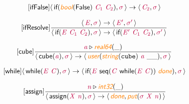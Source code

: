 \documentclass[10pt,leqno,fleqn]{article}
\newcommand{\artVariable}[1]{\mbox{\color{purple}\em #1\/}}
\newcommand{\artConstructor}[1]{\mbox{\sf #1}}
\newcommand{\artCaseInsensitiveLiteral}[1]{\mbox{\tt #1}}
\newcommand{\artSpecial}[1]{\mbox{\color{orange}\sf\em #1}}
\begin{document}
\begin{equation}
\tag*{[\artConstructor{\sf ifFalse}]}
\begin{split}\langle\, \artConstructor{\sf if}(\artSpecial{bool}(\artConstructor{\sf False})\ \artVariable{C$_{1}$}\ \artVariable{C$_{2}$}), \artVariable{$\sigma$}\,\rangle \rightarrow \langle\, \artVariable{C$_{2}$}, \artVariable{$\sigma$}\,\rangle 
\end{split}
\end{equation}

\begin{equation}
\tag*{[\artConstructor{\sf ifResolve}]}
\begin{split}\frac{\langle\, \artVariable{E}, \artVariable{$\sigma$}\,\rangle \rightarrow \langle\, \artVariable{E\/$^\prime$}, \artVariable{$\sigma$\/$^\prime$}\,\rangle }{\langle\, \artConstructor{\sf if}(\artVariable{E}\ \artVariable{C$_{1}$}\ \artVariable{C$_{2}$}), \artVariable{$\sigma$}\,\rangle \rightarrow \langle\, \artConstructor{\sf if}(\artVariable{E\/$^\prime$}\ \artVariable{C$_{1}$}\ \artVariable{C$_{2}$}), \artVariable{$\sigma$\/$^\prime$}\,\rangle }
\end{split}
\end{equation}

\begin{equation}
\tag*{[\artConstructor{\sf cube}]}
\begin{split}\frac{ \artVariable{a}\triangleright \artSpecial{real64}(\_) }{\langle\, \artConstructor{\sf cube}(\artVariable{a}), \artVariable{$\sigma$}\,\rangle \rightarrow \langle\, \artSpecial{user}(\artSpecial{string}(\artCaseInsensitiveLiteral{cube})\ \artVariable{a}\ \_\_), \artVariable{$\sigma$}\,\rangle }
\end{split}
\end{equation}

\begin{equation}
\tag*{[\artConstructor{\sf while}]}
\begin{split}\langle\, \artConstructor{\sf while}(\artVariable{E}\ \artVariable{C}), \artVariable{$\sigma$}\,\rangle \rightarrow \langle\, \artConstructor{\sf if}(\artVariable{E}\ \artConstructor{\sf seq}(\artVariable{C}\ \artConstructor{\sf while}(\artVariable{E}\ \artVariable{C}))\ \artSpecial{done}), \artVariable{$\sigma$}\,\rangle 
\end{split}
\end{equation}

\begin{equation}
\tag*{[\artConstructor{\sf assign}]}
\begin{split}\frac{ \artVariable{n}\triangleright \artSpecial{int32}(\_) }{\langle\, \artConstructor{\sf assign}(\artVariable{X}\ \artVariable{n}), \artVariable{$\sigma$}\,\rangle \rightarrow \langle\, \artSpecial{done}, \artSpecial{put}(\artVariable{$\sigma$}\ \artVariable{X}\ \artVariable{n})\,\rangle }
\end{split}
\end{equation}
\end{document}
